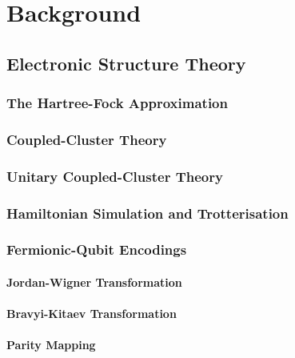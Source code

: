\chapter{\label{ch:2-background}Background}

\section{Electronic Structure Theory}
\subsection{The Hartree-Fock Approximation}
\subsection{Coupled-Cluster Theory}
\subsection{Unitary Coupled-Cluster Theory}
\subsection{Hamiltonian Simulation and Trotterisation}

\subsection{Fermionic-Qubit Encodings}
\subsubsection{Jordan-Wigner Transformation}
\subsubsection{Bravyi-Kitaev Transformation}
\subsubsection{Parity Mapping}


